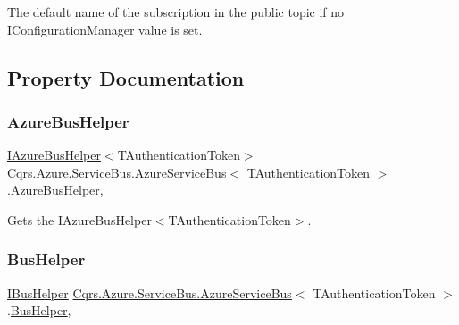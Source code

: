 The default name of the subscription in the public topic if no I\+Configuration\+Manager value is set. 



\subsection{Property Documentation}
\mbox{\label{classCqrs_1_1Azure_1_1ServiceBus_1_1AzureServiceBus_a7c537c53265bf01d550982c04579493e_a7c537c53265bf01d550982c04579493e}} 
\subsubsection{\texorpdfstring{Azure\+Bus\+Helper}{AzureBusHelper}}
{\footnotesize\ttfamily \hyperlink{interfaceCqrs_1_1Azure_1_1ServiceBus_1_1IAzureBusHelper}{I\+Azure\+Bus\+Helper}$<$T\+Authentication\+Token$>$ \hyperlink{classCqrs_1_1Azure_1_1ServiceBus_1_1AzureServiceBus}{Cqrs.\+Azure.\+Service\+Bus.\+Azure\+Service\+Bus}$<$ T\+Authentication\+Token $>$.\hyperlink{classCqrs_1_1Azure_1_1ServiceBus_1_1AzureBusHelper}{Azure\+Bus\+Helper}\hspace{0.3cm}{\ttfamily [get]}, {\ttfamily [protected]}}



Gets the I\+Azure\+Bus\+Helper$<$\+T\+Authentication\+Token$>$. 

\mbox{\label{classCqrs_1_1Azure_1_1ServiceBus_1_1AzureServiceBus_aba45a2bece8e265b9f06695b1e90a2a1_aba45a2bece8e265b9f06695b1e90a2a1}} 
\subsubsection{\texorpdfstring{Bus\+Helper}{BusHelper}}
{\footnotesize\ttfamily \hyperlink{interfaceCqrs_1_1Bus_1_1IBusHelper}{I\+Bus\+Helper} \hyperlink{classCqrs_1_1Azure_1_1ServiceBus_1_1AzureServiceBus}{Cqrs.\+Azure.\+Service\+Bus.\+Azure\+Service\+Bus}$<$ T\+Authentication\+Token $>$.\hyperlink{classCqrs_1_1Bus_1_1BusHelper}{Bus\+Helper}\hspace{0.3cm}{\ttfamily [get]}, {\ttfamily [protected]}}



